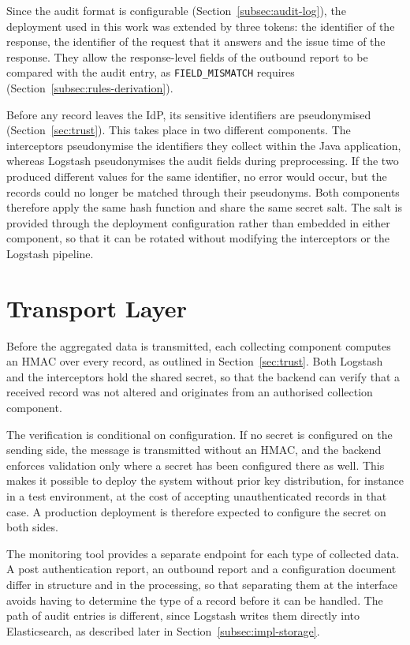 \documentclass[../main.tex]{subfiles}
\begin{document}
Since the audit format is configurable (Section~\ref{subsec:audit-log}), the deployment used in this 
work was extended by three tokens: the identifier of the response, the identifier of the request that 
it answers and the issue time of the response. 
They allow the response-level fields of the outbound report to be compared with the audit entry, as 
\texttt{FIELD\_\allowbreak{}MISMATCH} requires (Section~\ref{subsec:rules-derivation}). 

Before any record leaves the IdP, its sensitive identifiers are pseudonymised 
(Section~\ref{sec:trust}). 
This takes place in two different components. 
The interceptors pseudonymise the identifiers they collect within the Java application, whereas 
Logstash pseudonymises the audit fields during preprocessing. 
If the two produced different values for the same identifier, no error would occur, but the 
records could no longer be matched through their pseudonyms. 
Both components therefore apply the same hash function and share the same secret salt. 
The salt is provided through the deployment configuration rather than embedded in either 
component, so that it can be rotated without modifying the interceptors or the Logstash pipeline. 

\section{Transport Layer}\label{sec:impl-transport}

Before the aggregated data is transmitted, each collecting component computes an HMAC over 
every record, as outlined in Section~\ref{sec:trust}. 
Both Logstash and the interceptors hold the shared secret, so that the backend can verify that a 
received record was not altered and originates from an authorised collection component. 

The verification is conditional on configuration. 
If no secret is configured on the sending side, the message is transmitted without an HMAC, 
and the backend enforces validation only where a secret has been configured there as well. 
This makes it possible to deploy the system without prior key distribution, for instance in a 
test environment, at the cost of accepting unauthenticated records in that case. 
A production deployment is therefore expected to configure the secret on both sides. 

The monitoring tool provides a separate endpoint for each type of collected data. 
A post authentication report, an outbound report and a configuration document 
differ in structure and in the processing, so that separating them at the interface 
avoids having to determine the type of a record before it can be handled. 
The path of audit entries is different, since Logstash writes them directly into 
Elasticsearch, as described later in Section~\ref{subsec:impl-storage}. 
\end{document}
